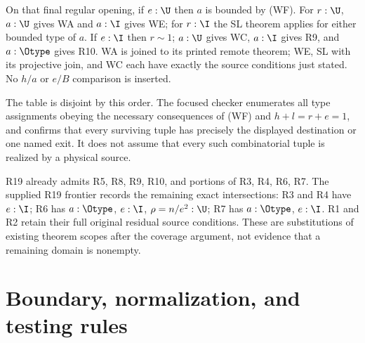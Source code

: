 On that final regular opening, if $e:\U$ then $a$ is bounded by
(WF). For $r:\U$, $a:\U$ gives WA and $a:\I$ gives WE; for
$r:\I$ the SL theorem applies for either bounded type of $a$.
If $e:\I$ then $r\sim1$; $a:\U$ gives WC, $a:\I$ gives R9,
and $a:\Otype$ gives R10. WA is joined to its printed remote theorem;
WE, SL with its projective join, and WC each have exactly the source
conditions just stated. No $h/a$ or $e/B$ comparison is inserted.

The table is disjoint by this order. The focused checker enumerates
all type assignments obeying the necessary consequences of (WF) and
$h+l=r+e=1$, and confirms that every surviving tuple has precisely
the displayed destination or one named exit. It does not assume that
every such combinatorial tuple is realized by a physical source.

R19 already admits R5, R8, R9, R10, and portions of R3, R4, R6, R7.
The supplied R19 frontier records the remaining exact intersections:
R3 and R4 have $e:\I$; R6 has $a:\Otype$, $e:\I$,
$\rho=n/e^2:\U$; R7 has $a:\Otype$, $e:\I$.
R1 and R2 retain their full original residual source conditions.
These are substitutions of existing theorem scopes after the coverage
argument, not evidence that a remaining domain is nonempty.

\section{Boundary, normalization, and testing rules}

